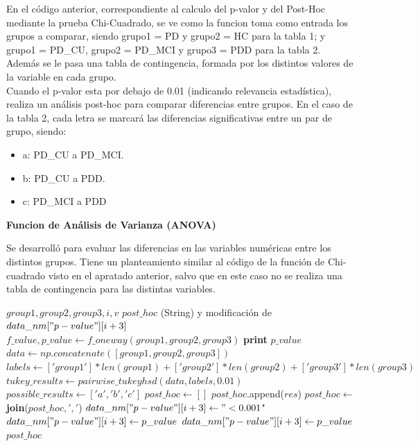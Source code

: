 \begin{description}
	En el código anterior, correspondiente al calculo del p-valor y del Post-Hoc mediante la prueba Chi-Cuadrado, se ve como la funcion toma como entrada los grupos a comparar, siendo grupo1 = PD y grupo2 = HC para la tabla 1; y grupo1 = PD\_CU, grupo2 = PD\_MCI y grupo3 = PDD para la tabla 2. Además se le pasa una tabla de contingencia, formada por los distintos valores de la variable en cada grupo.\\
	
	Cuando el p-valor esta por debajo de 0.01 (indicando relevancia estadística), realiza un análisis post-hoc para comparar diferencias entre grupos. En el caso de la tabla 2, cada letra se marcará las diferencias significativas entre un  par de grupo, siendo:
	\begin{itemize}
		\item a: PD\_CU a PD\_MCI.
		\item b: PD\_CU a PDD.
		\item c: PD\_MCI a PDD
	\end{itemize}
	
	\item {\textbf{Funcion de Análisis de Varianza (ANOVA)}} 
	
	Se desarrolló para evaluar las diferencias en las variables numéricas entre los distintos grupos. Tiene un planteamiento similar al código de la función de Chi-cuadrado visto en el apratado anterior, salvo que en este caso no se realiza una tabla de contingencia para las distintas variables.\\
	\begin{algorithm}
		\caption{one\_way\_anova\_with\_posthoc}
		\begin{algorithmic}
			\REQUIRE $group1, group2, group3, i, v$
			\ENSURE $post\_hoc$ (String) y modificación de $data\_nm["p-value"][i+3]$
			\STATE $f\_value, p\_value \leftarrow f\_oneway(group1, group2, group3)$
			\STATE \textbf{print} $p\_value$
			\STATE $data \leftarrow np.concatenate([group1, group2, group3])$
			\STATE $labels \leftarrow ['group1'] * len(group1) + ['group2'] * len(group2) + ['group3'] * len(group3)$
			\STATE $tukey\_results \leftarrow pairwise\_tukeyhsd(data, labels, 0.01)$
			\STATE $possible\_results \leftarrow ['a', 'b', 'c']$
			\STATE $post\_hoc \leftarrow []$
			\STATE $post\_hoc$.append($res$)
			\ENDIF
			\ENDFOR
			\STATE $post\_hoc \leftarrow$ \textbf{join}($post\_hoc, ','$)
			\STATE $data\_nm["p-value"][i+3] \leftarrow "< 0.001$"
			\ELSE
			\STATE $data\_nm["p-value"][i+3] \leftarrow p\_value$
			\ENDIF
			\ELSE
			\STATE $data\_nm["p-value"][i+3] \leftarrow p\_value$
			\ENDIF
			\RETURN $post\_hoc$
		\end{algorithmic}
	\end{algorithm}
	

\end{description}
